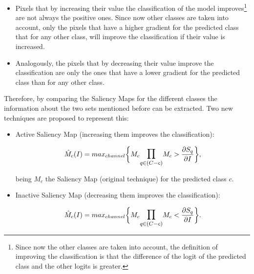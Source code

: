 \documentclass[preprint,12pt]{elsarticle}
\begin{document}
\begin{itemize}
    \item Pixels that by increasing their value the classification of the model improves\footnote{Since now the other classes are taken into account, the definition of improving the classification is that the difference of the logit of the predicted class and the other logits is greater.} are not always the positive ones. Since now other classes are taken into account, only the pixels that have a higher gradient for the predicted class that for any other class, will improve the classification if their value is increased.
    \item Analogously, the pixels that by decreasing their value improve the classification are only the ones that have a lower gradient for the predicted class than for any other class.
\end{itemize}

Therefore, by comparing the Saliency Maps for the different classes the information about the two sets mentioned before can be extracted. Two new techniques are proposed to represent this:

\begin{itemize}
    \item Active Saliency Map (increasing them improves the classification):
    
    \begin{equation}
        \label{eq: active saliency map}
        \hat{M}_c(I) = max_{channel} \bigg \{ M_c \mathlarger{\mathlarger{\prod}}_{q \in (C-c)}M_c > \frac{\partial S_q}{\partial I} \bigg \},
    \end{equation}

    being $M_c$ the Saliency Map (original technique) for the predicted class $c$.

    \item Inactive Saliency Map (decreasing them improves the classification):
    
    \begin{equation}
        \label{eq: inactive saliency map}
        \hat{M}_c(I) = max_{channel} \bigg \{ M_c \mathlarger{\mathlarger{\prod}}_{q \in (C-c)}M_c < \frac{\partial S_q}{\partial I} \bigg \}.
    \end{equation}

\end{itemize}
\end{document}

